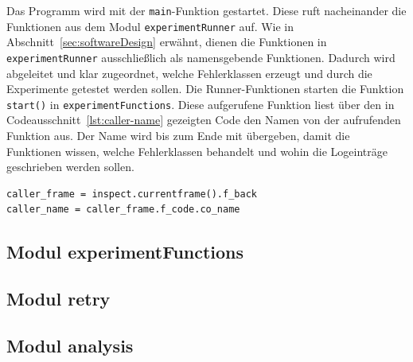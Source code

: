 Das Programm wird mit der \texttt{main}-Funktion gestartet.
Diese ruft nacheinander die Funktionen aus dem Modul \texttt{experimentRunner} auf.
Wie in Abschnitt~\ref{sec:softwareDesign} erwähnt, dienen die Funktionen in \texttt{experimentRunner}
ausschließlich als namensgebende Funktionen.
Dadurch wird abgeleitet und klar zugeordnet, welche Fehlerklassen erzeugt und durch die Experimente getestet werden
sollen.
Die Runner-Funktionen starten die Funktion \texttt{start()} in \texttt{experimentFunctions}.
Diese aufgerufene Funktion liest über den in Codeausschnitt~\ref{lst:caller-name} gezeigten Code den Namen von der
aufrufenden Funktion aus.
Der Name wird bis zum Ende mit übergeben, damit die Funktionen wissen, welche Fehlerklassen behandelt und wohin die
Logeinträge geschrieben werden sollen.

\begin{lstlisting}[style=pythoncode, caption={Ermittlung des Namens der aufrufenden Funktion}, label={lst:caller-name}]
caller_frame = inspect.currentframe().f_back
caller_name = caller_frame.f_code.co_name
\end{lstlisting}

\subsection{Modul experimentFunctions}
\label{subsec:experimentFunctionsImpl}


\subsection{Modul retry}
\label{subsec:retryImpl}


\subsection{Modul analysis}
\label{subsec:analysisImpl}

